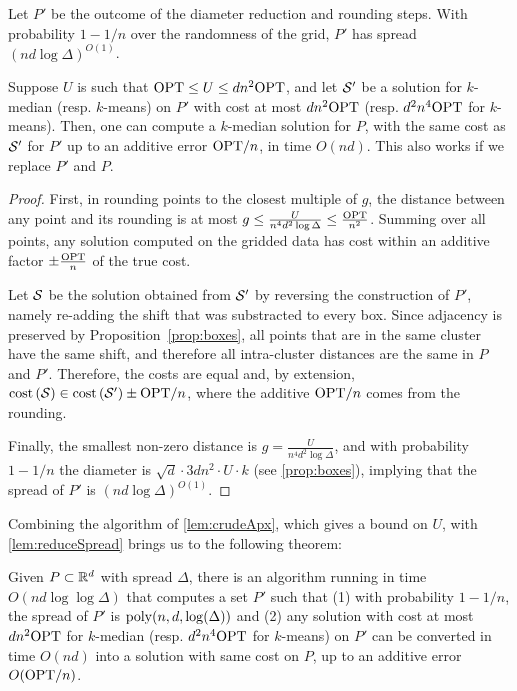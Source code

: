 \begin{lemma}\label{lem:reduceSpread}

Let $P'$ be the outcome of the diameter reduction and rounding steps. With probability $1-1/n$ over the randomness of the grid, $P'$ has spread $(nd \log
\Delta)^{O(1)}$.

Suppose $U$ is such that $\text{OPT} \leq U \leq d n^2 \text{OPT}$, and let $\mathcal S'$ be a solution for $k$-median (resp. $k$-means) on $P'$ with cost at most $d n^2
\text{OPT}$ (resp. $d^2 n^4 \text{OPT}$ for $k$-means). Then, one can compute a $k$-median solution for $P$, with the same cost as $\mathcal S'$ for $P'$ up to an
additive error $\text{OPT} / n$, in time $O(nd)$. This also works if we replace $P'$ and $P$.

\end{lemma}
\begin{proof}
First, in rounding points to the closest multiple of $g$, the distance between any point and its rounding is at most $g \leq \frac{U}{n^4 d^2 \log \Delta} \leq
\frac{\text{OPT}}{n^2}$. Summing over all points, any solution computed on the gridded data has cost within an additive factor $\pm \frac{\text{OPT}}{n}$ of the true cost. 


Let $\mathcal S$ be the solution obtained from $\mathcal S'$ by reversing the construction of $P'$, namely re-adding the shift that was substracted to every box. Since
adjacency is preserved by Proposition~\ref{prop:boxes}, all points that are in the same cluster have the same shift, and therefore all intra-cluster distances
are the same in $P$ and $P'$.  Therefore, the costs are equal and, by extension, $\operatorname{cost} \left( \mathcal S \right) \in \operatorname{cost} \left( \mathcal S' \right) \pm \text{OPT} / n$,
where the additive $\text{OPT} /n$ comes from the rounding.

Finally, the smallest non-zero distance is $g = \frac{U}{n^4 d^{2} \log \Delta}$, and with probability $1-1/n$ the diameter is $\sqrt{d} \cdot 3d n^2\cdot
U \cdot k$ (see \cref{prop:boxes}), implying that the spread of $P'$ is $(nd \log \Delta)^{O(1)}$.
\end{proof}

Combining the algorithm of \cref{lem:crudeApx}, which gives a bound on $U$, with \cref{lem:reduceSpread} brings us to the following theorem:

\begin{theorem}

Given $P \subset \mathbb{R}^d$ with spread $\Delta$, there is an algorithm running in time $O(nd \log \log \Delta)$ that computes a set $P'$ such that (1) with
probability $1-1/n$, the spread of $P'$ is $\operatorname{poly}(n,d, \log(\Delta))$ and (2) any solution with cost at most $d n^2 \text{OPT}$ for  $k$-median (resp. $d^2 n^4 \text{OPT}$
for $k$-means) on $P'$ can be converted in time $O(nd)$ into a solution with same cost on $P$, up to an additive error $O(\text{OPT} / n)$.

\end{theorem}

